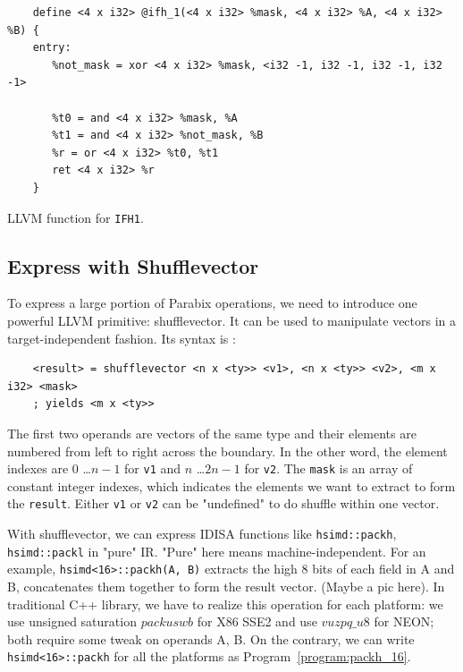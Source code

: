 \begin{program}
  \begin{verbatim}
    define <4 x i32> @ifh_1(<4 x i32> %mask, <4 x i32> %A, <4 x i32> %B) {
    entry:
       %not_mask = xor <4 x i32> %mask, <i32 -1, i32 -1, i32 -1, i32 -1>

       %t0 = and <4 x i32> %mask, %A
       %t1 = and <4 x i32> %not_mask, %B
       %r = or <4 x i32> %t0, %t1
       ret <4 x i32> %r
    }
  \end{verbatim}
  \caption{LLVM function for {\tt IFH1}.}
  \label{program:ifh1}
\end{program}

\subsection{Express with Shufflevector}
To express a large portion of Parabix operations, we need to introduce one powerful LLVM primitive: shufflevector. It can be used to manipulate vectors in a target-independent fashion. Its syntax is \cite{llvm_lang_ref}:

\begin{verbatim}
    <result> = shufflevector <n x <ty>> <v1>, <n x <ty>> <v2>, <m x i32> <mask>
    ; yields <m x <ty>>
\end{verbatim}

The first two operands are vectors of the same type and their elements are numbered from left to right across the boundary. In the other word, the element indexes are $0$ \ldots $n-1$ for {\tt v1} and $n$ \ldots $2n-1$ for {\tt v2}. The {\tt mask} is an array of constant integer indexes, which indicates the elements we want to extract to form the {\tt result}. Either {\tt v1} or {\tt v2} can be "undefined" to do shuffle within one vector.

With shufflevector, we can express IDISA functions like \verb|hsimd::packh|, \verb|hsimd::packl| in "pure" IR. "Pure" here means machine-independent. For an example, \verb|hsimd<16>::packh(A, B)| extracts the high 8 bits of each field in A and B, concatenates them together to form the result vector. (Maybe a pic here). In traditional C++ library, we have to realize this operation for each platform: we use unsigned saturation $packuswb$ for X86 SSE2 and use $vuzpq\_u8$ for NEON; both require some tweak on operands A, B. On the contrary, we can write \verb|hsimd<16>::packh| for all the platforms as Program~\ref{program:packh_16}.

